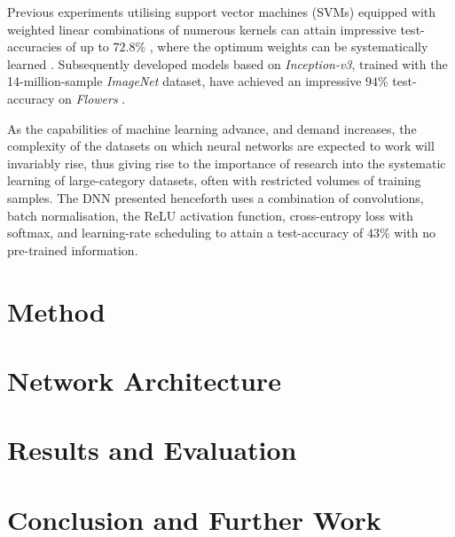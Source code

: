 \documentclass[journal]{IEEEtran}
\newcommand\networkperformance{43}
\begin{document}
Previous experiments utilising support vector machines (SVMs) equipped with
weighted linear combinations of numerous kernels can attain impressive
test-accuracies of up to $72.8$\% \cite{Nilsback:2008}, where the optimum
weights can be systematically learned \cite{Varma:2007}. Subsequently developed
models based on \emph{Inception-v3}, trained with the 14-million-sample
\emph{ImageNet} dataset, have achieved an impressive $94$\% test-accuracy on
\emph{Flowers} \cite{Xia:2017}.

As the capabilities of machine learning advance, and demand increases, the
complexity of the datasets on which neural networks are expected to work will
invariably rise, thus giving rise to the importance of research into the
systematic learning of large-category datasets, often with restricted volumes of
training samples.  The DNN presented henceforth uses a combination of
convolutions, batch normalisation, the ReLU activation function, cross-entropy
loss with softmax, and learning-rate scheduling to attain a test-accuracy of
$\networkperformance$\% with no pre-trained information.

\section{Method}
\section{Network Architecture}
\section{Results and Evaluation}
\section{Conclusion and Further Work}

\clearpage %


\end{document}
